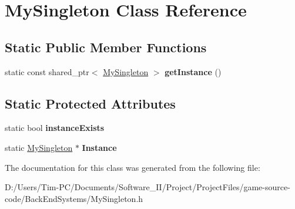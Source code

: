 \hypertarget{class_my_singleton}{}\section{My\+Singleton Class Reference}
\label{class_my_singleton}
\subsection*{Static Public Member Functions}
\begin{DoxyCompactItemize}
\item 
\mbox{\label{class_my_singleton_aece22342625b3e37fe6c050016d92820}} 
static const shared\+\_\+ptr$<$ \hyperlink{class_my_singleton}{My\+Singleton} $>$ {\bfseries get\+Instance} ()
\end{DoxyCompactItemize}
\subsection*{Static Protected Attributes}
\begin{DoxyCompactItemize}
\item 
\mbox{\label{class_my_singleton_a464682e62c26729fdcccf5dfb7a799bf}} 
static bool {\bfseries instance\+Exists}
\item 
\mbox{\label{class_my_singleton_a003dbee368dbc96befb1c3d84645d381}} 
static \hyperlink{class_my_singleton}{My\+Singleton} $\ast$ {\bfseries Instance}
\end{DoxyCompactItemize}


The documentation for this class was generated from the following file\+:\begin{DoxyCompactItemize}
\item 
D\+:/\+Users/\+Tim-\/\+P\+C/\+Documents/\+Software\+\_\+\+I\+I/\+Project/\+Project\+Files/game-\/source-\/code/\+Back\+End\+Systems/My\+Singleton.\+h\end{DoxyCompactItemize}
